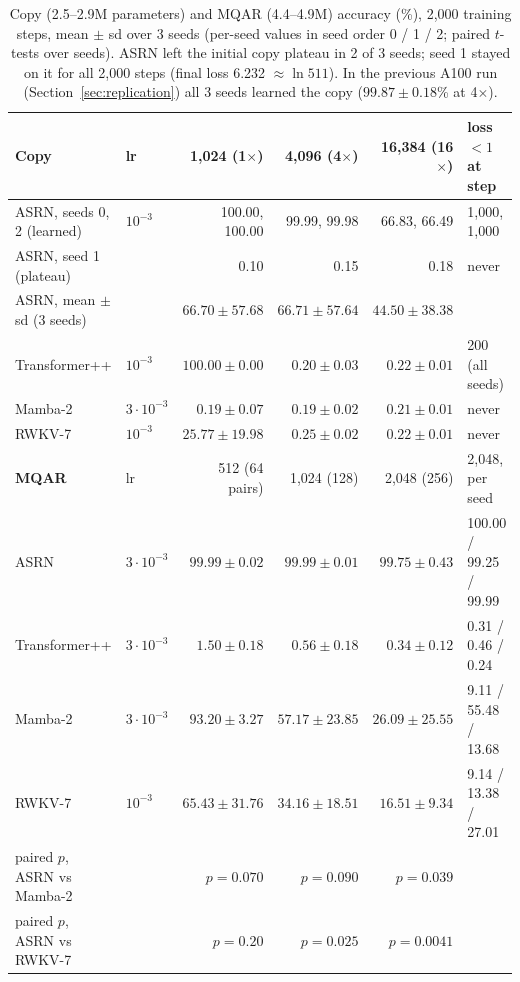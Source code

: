 \documentclass[11pt]{article}
\begin{document}
\begin{table}[t]
\centering\small
\setlength{\tabcolsep}{3pt}
\begin{tabular}{llrrrl}
\toprule
\textbf{Copy} & lr & 1{,}024 (1$\times$) & 4{,}096 (4$\times$) & 16{,}384 (16$\times$) & loss $<1$ at step\\
\midrule
ASRN, seeds 0, 2 (learned) & $10^{-3}$ & 100.00, 100.00 & 99.99, 99.98 & 66.83, 66.49 & 1{,}000, 1{,}000\\
ASRN, seed 1 (plateau) & & 0.10 & 0.15 & 0.18 & never\\
ASRN, mean $\pm$ sd (3 seeds) & & $66.70\pm57.68$ & $66.71\pm57.64$ & $44.50\pm38.38$ & \\
Transformer++ & $10^{-3}$ & $100.00\pm0.00$ & $0.20\pm0.03$ & $0.22\pm0.01$ & 200 (all seeds)\\
Mamba-2 & $3\cdot10^{-3}$ & $0.19\pm0.07$ & $0.19\pm0.02$ & $0.21\pm0.01$ & never\\
RWKV-7 & $10^{-3}$ & $25.77\pm19.98$ & $0.25\pm0.02$ & $0.22\pm0.01$ & never\\
\midrule
\textbf{MQAR} & lr & 512 (64 pairs) & 1{,}024 (128) & 2{,}048 (256) & 2{,}048, per seed\\
\midrule
ASRN & $3\cdot10^{-3}$ & $\mathbf{99.99\pm0.02}$ & $\mathbf{99.99\pm0.01}$ & $\mathbf{99.75\pm0.43}$ &
100.00 / 99.25 / 99.99\\
Transformer++ & $3\cdot10^{-3}$ & $1.50\pm0.18$ & $0.56\pm0.18$ & $0.34\pm0.12$ & 0.31 / 0.46 / 0.24\\
Mamba-2 & $3\cdot10^{-3}$ & $93.20\pm3.27$ & $57.17\pm23.85$ & $26.09\pm25.55$ & 9.11 / 55.48 / 13.68\\
RWKV-7 & $10^{-3}$ & $65.43\pm31.76$ & $34.16\pm18.51$ & $16.51\pm9.34$ & 9.14 / 13.38 / 27.01\\
paired $p$, ASRN vs Mamba-2 & & $p=0.070$ & $p=0.090$ & $p=0.039$ & \\
paired $p$, ASRN vs RWKV-7 & & $p=0.20$ & $p=0.025$ & $p=0.0041$ & \\
\bottomrule
\end{tabular}
\caption{Copy (2.5--2.9M parameters) and MQAR (4.4--4.9M) accuracy (\%), 2{,}000 training steps, mean $\pm$ sd over
3 seeds (per-seed values in seed order 0 / 1 / 2; paired $t$-tests over seeds). ASRN left the initial copy
plateau in 2 of 3 seeds; seed 1 stayed on it for all 2{,}000 steps (final loss 6.232 $\approx\ln 511$). In the previous
A100 run (Section~\ref{sec:replication}) all 3 seeds learned the copy ($99.87\pm0.18$\% at 4$\times$).}
\label{tab:copy}
\end{table}
\end{document}
